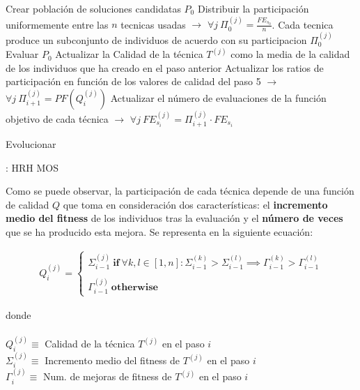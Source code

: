 \begin{algorithm}[H]
	\begin{algorithmic}[1]
		\STATE Crear población de soluciones candidatas $P_0$
		\STATE Distribuir la participación uniformemente entre las $n$ tecnicas usadas $\rightarrow$ $\forall j \ \Pi_{0}^{(j)} = \frac{FE_{s_{0}}}{n}$. Cada tecnica produce un subconjunto de individuos de acuerdo con su participacion $ \Pi_{0}^{(j)}$
		\STATE Evaluar $P_0$
		\STATE Actualizar la Calidad de la técnica $T^{(j)}$ como la media de la calidad de los individuos que ha creado en el paso anterior
		\STATE Actualizar los ratios de participación en función de los valores de calidad del paso 5 $\rightarrow$ $\forall j \ \Pi_{i+1}^{(j)} = PF(Q_i^{(j)})$
		\STATE Actualizar el número de evaluaciones de la función objetivo de cada técnica $\rightarrow$ $\forall j \ FE_{s_i}^{(j)} = \Pi_{i+1}^{(j)} \cdot FE_{s_i}$		
		
				\STATE Evolucionar
			\ENDWHILE
		\ENDFOR
		\ENDWHILE		
	\end{algorithmic}
	\caption{: HRH MOS } \label{Alg: MOS HRH}
\end{algorithm}

Como se puede observar, la participación de cada técnica depende de una función de calidad $Q$ que toma en consideración dos características: el \textbf{incremento medio del fitness} de los individuos tras la evaluación y el \textbf{número de veces} que se ha producido esta mejora. Se representa en la siguiente ecuación:

\begin{equation}\label{eq:QF_MOS}
	\begin{gathered}
		Q_i^{(j)} = 
						\begin{cases}
							\Sigma_{i-1}^{(j)} \ \textbf{if}  \ \forall k,l \in [1,n]: \Sigma_{i-1}^{(k)} > \Sigma_{i-1}^{(l)} \implies \Gamma_{i-1}^{(k)} > \Gamma_{i-1}^{(l)} \\ \\
							\Gamma_{i-1}^{(j)} \ \textbf{otherwise}
						\end{cases}
	\end{gathered}
\end{equation}

donde \\ \\
$Q_i^{(j)} \equiv$ Calidad de la técnica $T^{(j)}$ en el paso $i$\\
$\Sigma_i^{(j)} \equiv$ Incremento medio del fitness de $T^{(j)}$ en el paso $i$\\
$\Gamma_i^{(j)} \equiv$ Num. de mejoras de fitness de $T^{(j)}$ en el paso $i$	

